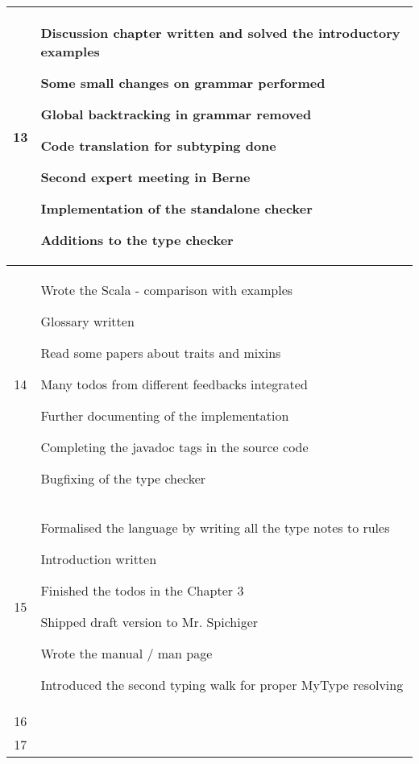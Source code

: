 \begin{center}
\begin{longtable}{|c|p{12cm}|}
13 &
\begin{journal}
	\item Discussion chapter written and solved the introductory examples
	\item Some small changes on grammar performed
	\item Global backtracking in grammar removed
	\item Code translation for subtyping done
	\item Second expert meeting in Berne
	\item Implementation of the standalone checker
	\item Additions to the type checker
\end{journal}
\\ \hline
14 &
\begin{journal}
	\item Wrote the Scala - \ooplss comparison with examples
	\item Glossary written
	\item Read some papers about traits and mixins
	\item Many todos from different feedbacks integrated
	\item Further documenting of the implementation
	\item Completing the javadoc tags in the source code
	\item Bugfixing of the type checker
\end{journal}
\\ \hline
15 &
\begin{journal}
	\item Formalised the language by writing all the type notes to rules
	\item Introduction written
	\item Finished the todos in the Chapter 3
	\item Shipped draft version to Mr. Spichiger
	\item Wrote the manual / man page
	\item Introduced the second typing walk for proper MyType resolving
\end{journal}
\\ \hline
16 &
\begin{journal}
	\item
\end{journal}
\\ \hline
17 &
\begin{journal}
	\item
\end{journal}
\\ \hline
\end{longtable}
\end{center}
